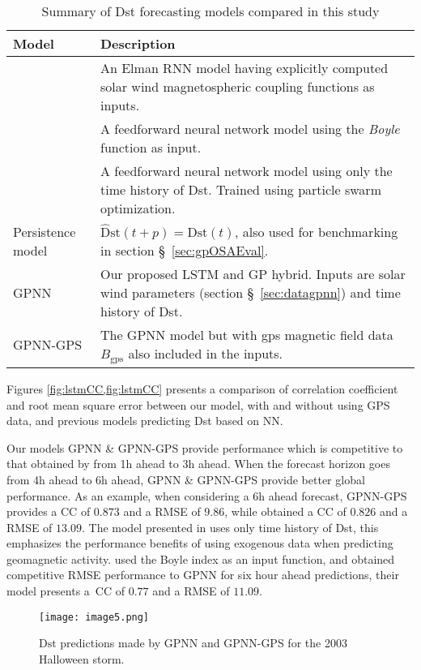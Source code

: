 \begin{table}[ht]
	\centering
	\caption{Summary of Dst forecasting models compared in this study}
	\label{table:competingmodels}
	\begin{tabular}{| l | p{} |}
		\hline
		Model & Description\\
		\hline
		\citet{wu1997geomagnetic} & An Elman RNN model having explicitly computed solar wind magnetospheric 
		coupling functions as inputs.\\
		\citet{Bala2012} & A feedforward neural network model using the \emph{Boyle} function as input.\\
		\citet{Lazzus} & A feedforward neural network model using only the time history of Dst. Trained using 
		particle swarm optimization.\\
		Persistence model & $\hat{\text{D}}\text{st}(t + p) = \text{Dst}(t)$, also used for benchmarking in 
		section \S~\ref{sec:gpOSAEval}.\\
		GPNN & Our proposed LSTM and GP hybrid. Inputs are solar wind parameters (section \S~\ref{sec:datagpnn}) 
		and time history of Dst.\\
		GPNN-GPS & The GPNN model but with gps magnetic field data $B_{\text{gps}}$ also included in the inputs. \\
		\hline
	\end{tabular}
\end{table}

Figures \cref{fig:lstmCC,fig:lstmCC} presents a comparison of correlation coefficient and root mean square error 
between our model, with and without using GPS data, and previous models predicting Dst based on NN. 

Our models GPNN \& GPNN-GPS provide performance which is competitive to that obtained by 
\citet{Lazzus} from 1h ahead to 3h ahead. When the forecast horizon goes from 4h ahead to 6h ahead, 
GPNN \& GPNN-GPS provide better global performance. As an example, when considering a 6h 
ahead forecast, GPNN-GPS provides a CC of $0.873$ and a RMSE of $9.86$, while \citet{Lazzus} 
obtained a CC of $0.826$ and a RMSE of $13.09$. The model presented in \citet{Lazzus} uses only time history of Dst, 
this emphasizes the performance benefits of using exogenous data when predicting geomagnetic activity. 
\citet{Bala2012} used the Boyle index as an input function, and obtained competitive RMSE performance to GPNN for 
six hour ahead predictions, their model presents a\ CC of $0.77$ and a RMSE of $11.09$.

\begin{figure}
	\texttt{[image: image5.png]}
	\caption{$\text{Dst}$ predictions made by GPNN and GPNN-GPS for the 2003 Halloween storm.}
    \label{fig:gpnngpshalloween}
\end{figure}


